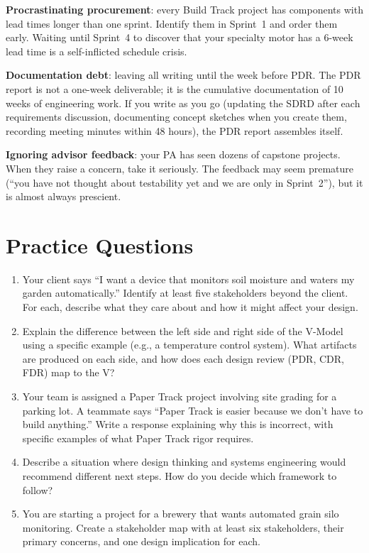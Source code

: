 \textbf{Procrastinating procurement}: every Build Track project has components with lead times longer than one sprint. Identify them in Sprint~1 and order them early. Waiting until Sprint~4 to discover that your specialty motor has a 6-week lead time is a self-inflicted schedule crisis.

\textbf{Documentation debt}: leaving all writing until the week before PDR. The PDR report is not a one-week deliverable; it is the cumulative documentation of 10 weeks of engineering work. If you write as you go (updating the SDRD after each requirements discussion, documenting concept sketches when you create them, recording meeting minutes within 48 hours), the PDR report assembles itself.

\textbf{Ignoring advisor feedback}: your PA has seen dozens of capstone projects. When they raise a concern, take it seriously. The feedback may seem premature (``you have not thought about testability yet and we are only in Sprint~2''), but it is almost always prescient.


\section{Practice Questions}
\begin{enumerate}[leftmargin=1.5em]
\item Your client says ``I want a device that monitors soil moisture and waters my garden automatically.'' Identify at least five stakeholders beyond the client. For each, describe what they care about and how it might affect your design.
\item Explain the difference between the left side and right side of the V-Model using a specific example (e.g., a temperature control system). What artifacts are produced on each side, and how does each design review (PDR, CDR, FDR) map to the V?
\item Your team is assigned a Paper Track project involving site grading for a parking lot. A teammate says ``Paper Track is easier because we don't have to build anything.'' Write a response explaining why this is incorrect, with specific examples of what Paper Track rigor requires.
\item Describe a situation where design thinking and systems engineering would recommend different next steps. How do you decide which framework to follow?
\item You are starting a project for a brewery that wants automated grain silo monitoring. Create a stakeholder map with at least six stakeholders, their primary concerns, and one design implication for each.
\end{enumerate}


